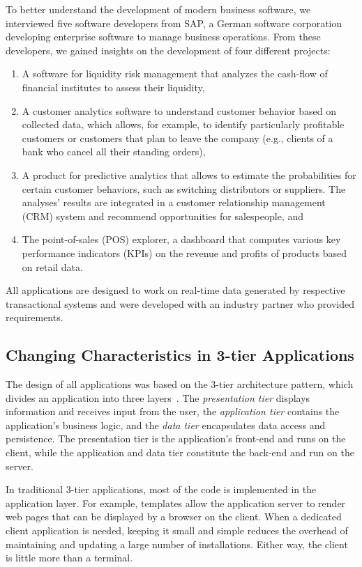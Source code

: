 \documentclass[
      english,
			conference,
      ]{IEEEtran}
\begin{document}
To better understand the development of modern business software, we interviewed five software developers from SAP, a German software corporation developing enterprise software to manage business operations.
From these developers, we gained insights on the development of four different projects:
\begin{enumerate}
	\item A software for liquidity risk management that analyzes the cash-flow of financial institutes to assess their liquidity,
	\item A customer analytics software to understand customer behavior based on collected data, which allows, for example, to identify particularly profitable customers or customers that plan to leave the company (e.g., clients of a bank who cancel all their standing orders),
	\item A product for predictive analytics that allows to estimate the probabilities for certain customer behaviors, such as switching distributors or suppliers. The analyses' results are integrated in a customer relationship management (CRM) system and recommend opportunities for salespeople, and
	\item The point-of-sales (POS) explorer, a dashboard that computes various key performance indicators (KPIs) on the revenue and profits of products based on retail data.
\end{enumerate}
%
All applications are designed to work on real-time data generated by respective transactional systems and were developed with an industry partner who provided requirements.

\subsection{Changing Characteristics in 3-tier Applications}

The design of all applications was based on the 3-tier architecture pattern, which divides an application into three layers~\cite{eckerson_95_three_tier_clientserver_architecture}.
The \emph{presentation tier} displays information and receives input from the user,
the \emph{application tier} contains the application's business logic, and
the \emph{data tier} encapsulates data access and persistence.
The presentation tier is the application's front-end and runs on the client, while the application and data tier constitute the back-end and run on the server.

In traditional 3-tier applications, most of the code is implemented in the application layer.
For example, templates allow the application server to render web pages that can be displayed by a browser on the client.
When a dedicated client application is needed, keeping it small and simple reduces the overhead of maintaining and updating a large number of installations.
Either way, the client is little more than a terminal.
\end{document}
